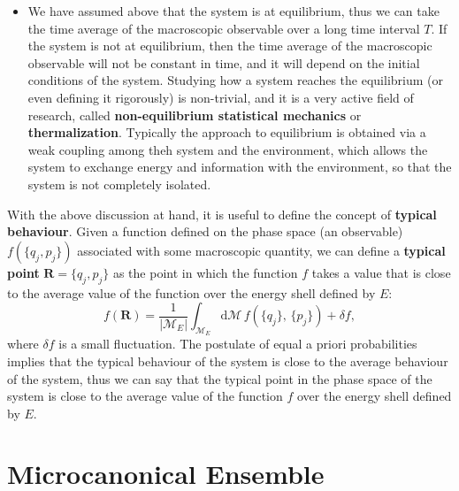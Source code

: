 \begin{itemize}
    \item We have assumed above that the system is at equilibrium, thus we can take the time average of the macroscopic observable over a long time interval \(T\). If the system is not at equilibrium, then the time average of the macroscopic observable will not be constant in time, and it will depend on the initial conditions of the system. Studying how a system reaches the equilibrium (or even defining it rigorously) is non-trivial, and it is a very active field of research, called \textbf{non-equilibrium statistical mechanics} or \textbf{thermalization}. Typically the approach to equilibrium is obtained via a weak coupling among theh system and the environment, which allows the system to exchange energy and information with the environment, so that the system is not completely isolated.
\end{itemize}

With the above discussion at hand, it is useful to define the concept of \textbf{typical behaviour}. Given a function defined on the phase space (an observable) \(f(\{q_j, p_j\})\) associated with some macroscopic quantity, we can define a \textbf{typical point} \(\mathbf{R} = \{q_j,p_j\}\) as the point in which the function \(f\) takes a value that is close to the average value of the function over the energy shell defined by \(E\):
\[
    f(\mathbf{R}) = \frac{1}{|\mathcal{M}_E|} \int_{\mathcal{M}_E} \mathrm{d} \mathcal{M} \, f(\{q_j\},\,\{p_j\}) + \delta f,
\]
where \(\delta f\) is a small fluctuation. The postulate of equal a priori probabilities implies that the typical behaviour of the system is close to the average behaviour of the system, thus we can say that the typical point in the phase space of the system is close to the average value of the function \(f\) over the energy shell defined by \(E\).

\section{Microcanonical Ensemble}

